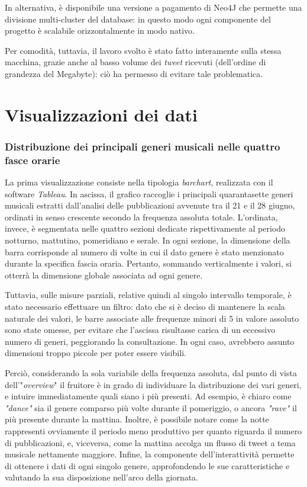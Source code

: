 \documentclass[12pt, a4paper, twocolumn]{article} %
\begin{document}
In alternativa, è disponibile una versione a pagamento di Neo4J\cite{neo4jEnterprise} che permette una divisione multi-cluster del database: in questo modo ogni componente del progetto è scalabile orizzontalmente in modo nativo.

Per comodità, tuttavia, il lavoro svolto è stato fatto interamente sulla stessa macchina, grazie anche al basso volume dei \textit{tweet} ricevuti (dell'ordine di grandezza del Megabyte): ciò ha permesso di evitare tale problematica.

\hfill
\newpage
\hfill
\newpage
\part{Visualizzazioni dei dati}
\section{Distribuzione dei principali generi musicali nelle quattro fasce orarie}
La prima visualizzazione consiste nella tipologia \textit{barchart}, realizzata con il software \textit{Tableau}.
In ascissa, il grafico raccoglie i principali quarantasette generi musicali estratti dall'analisi delle pubblicazioni avvenute tra il 21 e il 28 giugno, ordinati in senso crescente secondo la frequenza assoluta totale. 
L'ordinata, invece, è segmentata nelle quattro sezioni dedicate rispettivamente al periodo notturno, mattutino, pomeridiano e serale. 
In ogni sezione, la dimensione della barra corrisponde al numero di volte in cui il dato genere è stato menzionato durante la specifica fascia oraria.
Pertanto, sommando verticalmente i valori, si otterrà la dimensione globale associata ad ogni genere.

Tuttavia, sulle misure parziali, relative quindi al singolo intervallo temporale, è stato necessario effettuare un filtro: dato che si è deciso di mantenere la scala naturale dei valori, le barre associate alle frequenze minori di 5 in valore assoluto sono state omesse, per evitare che l'ascissa risultasse carica di un eccessivo numero di generi, peggiorando la consultazione.
In ogni caso, avrebbero assunto dimensioni troppo piccole per poter essere visibili.

Perciò, considerando la sola variabile della frequenza assoluta, dal punto di vista dell'"\textit{overview}" il fruitore è in grado di individuare la distribuzione dei vari generi, e intuire immediatamente quali siano i più presenti. 
Ad esempio, è chiaro come \textit{"dance"} sia il genere comparso più volte durante il pomeriggio, o ancora \textit{"rave"} il più presente durante la mattina. 
Inoltre, è possibile notare come la notte rappresenti ovviamente il periodo meno produttivo per quanto riguarda il numero di pubblicazioni, e, viceversa, come la mattina accolga un flusso di tweet a tema musicale nettamente maggiore. 
Infine, la componente dell'interattività permette di ottenere i dati di ogni singolo genere, approfondendo le sue caratteristiche e valutando la sua disposizione nell'arco della giornata.
\end{document}
